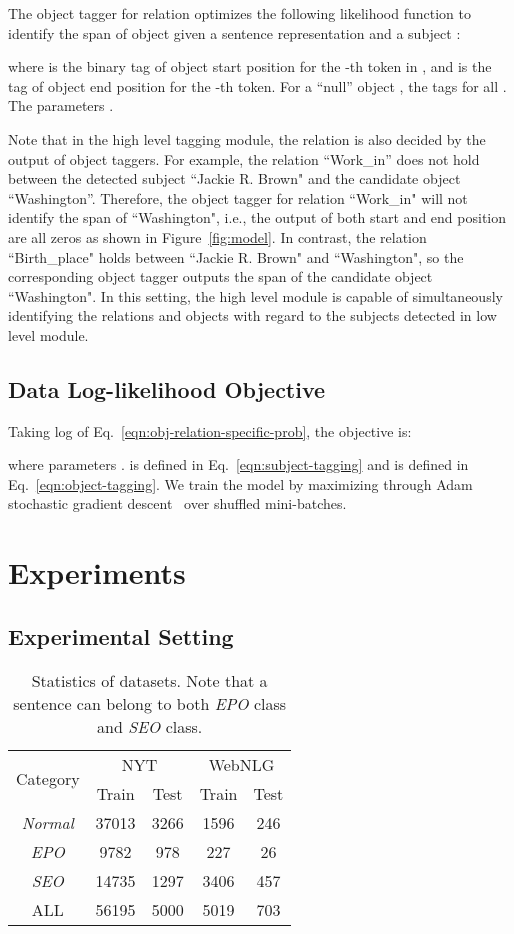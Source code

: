 \documentclass[11pt,a4paper]{article}
\begin{document}
\par The object tagger for relation  optimizes the following likelihood function to identify the span of object  given a sentence representation  and a subject :
	
where  is the binary tag of object start position for the -th token in , and  is the tag of object end position for the -th token. For a ``null'' object , the tags  for all . The parameters . 

\par Note that in the high level tagging module, the relation is also decided by the output of object taggers. For example, the relation ``Work\_in'' does not hold between the detected subject ``Jackie R. Brown" and the candidate object ``Washington''. Therefore, the object tagger for relation ``Work\_in" will not identify the span of ``Washington", i.e., the output of both start and end position are all zeros as shown in Figure~\ref{fig:model}. In contrast, the relation ``Birth\_place" holds between ``Jackie R. Brown" and ``Washington", so the corresponding object tagger outputs the span of the candidate object ``Washington". In this setting, the high level module is capable of simultaneously identifying the relations and objects with regard to the subjects detected in low level module.
\subsection{Data Log-likelihood Objective} 
\par Taking log of Eq.~\eqref{eqn:obj-relation-specific-prob}, the objective  is:

where parameters .  is defined in Eq.~\eqref{eqn:subject-tagging} and  is defined in Eq.~\eqref{eqn:object-tagging}. We train the model by maximizing  through Adam stochastic gradient descent~\citep{kingma2014Adam} over shuffled mini-batches. 	
	\section{Experiments} 
	\subsection{Experimental Setting}
\renewcommand{\arraystretch}{1} \begin{table}[!t] 
		\centering 
		\small
		\begin{tabular}{ccccc} 
			\toprule
			\multirow{2}{*}{Category}& 
			\multicolumn{2}{c}{NYT}&\multicolumn{2}{c}{WebNLG}\\
			\cmidrule(lr){2-3} \cmidrule(lr){4-5} &Train&Test&Train&Test\\
			\midrule 
			\textit{Normal}&37013&3266&1596&246\\
			\textit{EPO}&9782&978&227&26\\
			\textit{SEO}&14735&1297&3406&457\\
			\midrule 
			ALL&56195&5000&5019&703\\
			\bottomrule 
		\end{tabular} 
		\caption{Statistics of datasets. Note that a sentence can belong to both \emph{EPO} class and \emph{SEO} class.} 
		\label{tab:statistics} 
	\end{table}
\end{document}

